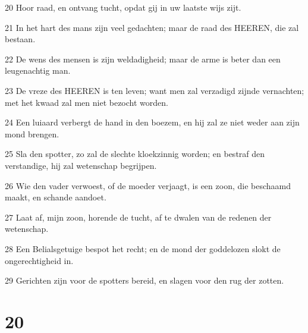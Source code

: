 \par 20 Hoor raad, en ontvang tucht, opdat gij in uw laatste wijs zijt.
\par 21 In het hart des mans zijn veel gedachten; maar de raad des HEEREN, die zal bestaan.
\par 22 De wens des mensen is zijn weldadigheid; maar de arme is beter dan een leugenachtig man.
\par 23 De vreze des HEEREN is ten leven; want men zal verzadigd zijnde vernachten; met het kwaad zal men niet bezocht worden.
\par 24 Een luiaard verbergt de hand in den boezem, en hij zal ze niet weder aan zijn mond brengen.
\par 25 Sla den spotter, zo zal de slechte kloekzinnig worden; en bestraf den verstandige, hij zal wetenschap begrijpen.
\par 26 Wie den vader verwoest, of de moeder verjaagt, is een zoon, die beschaamd maakt, en schande aandoet.
\par 27 Laat af, mijn zoon, horende de tucht, af te dwalen van de redenen der wetenschap.
\par 28 Een Belialsgetuige bespot het recht; en de mond der goddelozen slokt de ongerechtigheid in.
\par 29 Gerichten zijn voor de spotters bereid, en slagen voor den rug der zotten.

\chapter{20}

